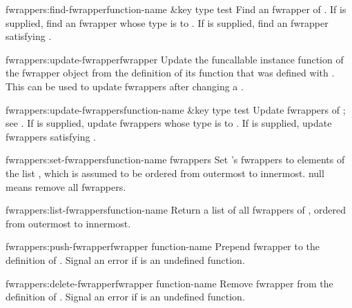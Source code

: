 \begin{defun}{fwrappers:}{find-fwrapper}{function-name \&key type test}
  Find an fwrapper of .  If  is supplied,
  find an fwrapper whose type is  to .  If
   is supplied, find an fwrapper satisfying .
\end{defun}

\begin{defun}{fwrappers:}{update-fwrapper}{fwrapper}
  Update the funcallable instance function of the fwrapper object
   from the definition of its function that was 
  defined with .  This can be used to update
  fwrappers after changing a .
\end{defun}

\begin{defun}{fwrappers:}{update-fwrappers}{function-name \&key type test}
  Update fwrappers of ; see .
  If  is supplied, update fwrappers whose type is
   to .  If  is supplied, update fwrappers
  satisfying .
\end{defun}

\begin{defun}{fwrappers:}{set-fwrappers}{function-name fwrappers}
  Set 's fwrappers to elements of the list
  , which is assumed to be ordered from outermost to
  innermost.   null means remove all fwrappers.
\end{defun}

\begin{defun}{fwrappers:}{list-fwrappers}{function-name}
  Return a list of all fwrappers of , ordered
  from outermost to innermost.
\end{defun}

\begin{defun}{fwrappers:}{push-fwrapper}{fwrapper function-name}
  Prepend fwrapper  to the definition of
  .  Signal an error if  is an
  undefined function.
\end{defun}

\begin{defun}{fwrappers:}{delete-fwrapper}{fwrapper function-name}
  Remove fwrapper  from the definition of
  .  Signal an error if  is an
  undefined function.
\end{defun}

